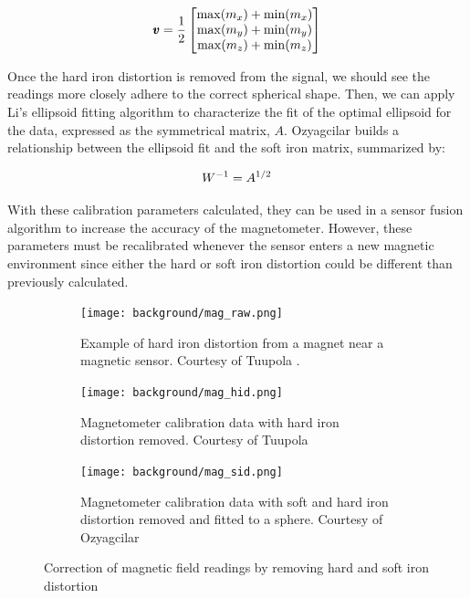 \begin{equation} \labeq{hard_iron_offset}
    \pmb{v}=\frac{1}{2}
    \begin{bmatrix}
        \max(m_x)+\min(m_x) \\
        \max(m_y)+\min(m_y) \\
        \max(m_z)+\min(m_z)
    \end{bmatrix}
\end{equation}

Once the hard iron distortion is removed from the signal, we should see the readings more closely adhere to the correct spherical shape. 
Then, we can apply Li’s ellipsoid fitting algorithm \cite{Li:2004} to characterize the fit of the optimal ellipsoid for the data, expressed as the symmetrical matrix, $A$. 
Ozyagcilar \cite{Ozyagcilar:2015} builds a relationship between the ellipsoid fit and the soft iron matrix, summarized by:

\begin{equation} \labeq{soft_iron_matrix}
    W^{-1}=A^{1/2}
\end{equation}

With these calibration parameters calculated, they can be used in a sensor fusion algorithm to increase the accuracy of the magnetometer. 
However, these parameters must be recalibrated whenever the sensor enters a new magnetic environment since either the hard or soft iron distortion could be different than previously calculated.

\begin{figure}
    \centering
    \begin{subfigure}[b]{0.3\textwidth}
        \centering
        \texttt{[image: background/mag\_raw.png]}
        \caption[Raw Magnetometer Readings]{Example of hard iron distortion from a magnet near a magnetic sensor. Courtesy of Tuupola \cite{Tuupola:2018}.}
        \label{subfig:mag_raw}
    \end{subfigure}
    \hfill
    \begin{subfigure}[b]{0.3\textwidth}
        \centering
        \texttt{[image: background/mag\_hid.png]}
        \caption[Hard Iron Distortion Removed]{Magnetometer calibration data with hard iron distortion removed. Courtesy of Tuupola \cite{Tuupola:2018}}
        \label{subfig:mag_hid}
    \end{subfigure}
    \hfill
    \begin{subfigure}[b]{0.3\textwidth}
        \centering
        \texttt{[image: background/mag\_sid.png]}
        \caption[Soft Iron Distortion Removed]{Magnetometer calibration data with soft and hard iron distortion removed and fitted to a sphere. Courtesy of Ozyagcilar \cite{Ozyagcilar:2015}}
        \label{subfig:mag_sid}
    \end{subfigure}
       \caption{Correction of magnetic field readings by removing hard and soft iron distortion}
\end{figure}

